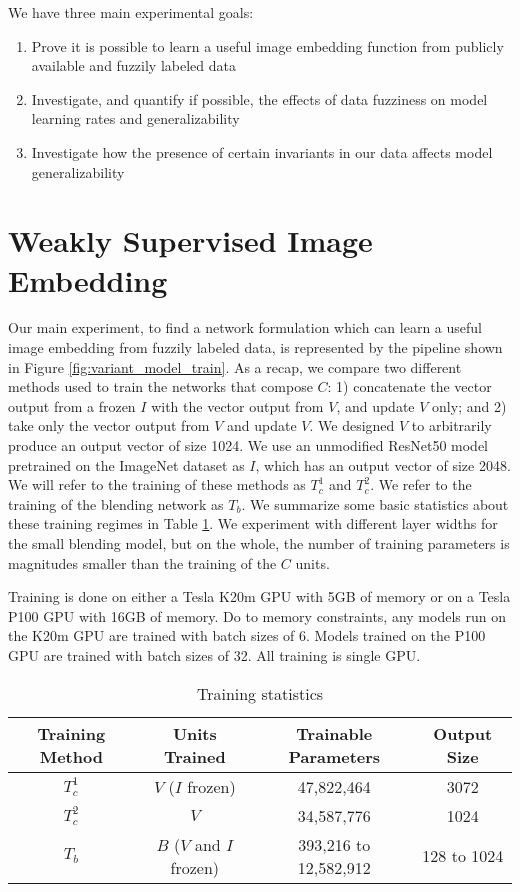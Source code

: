 We have three main experimental goals:
\begin{enumerate}
	\item Prove it is possible to learn a useful image embedding function from publicly available and fuzzily labeled data
	\item Investigate, and quantify if possible, the effects of data fuzziness on model learning rates and generalizability
	\item Investigate how the presence of certain invariants in our data affects model generalizability
\end{enumerate}




\section{Weakly Supervised Image Embedding}
Our main experiment, to find a network formulation which can learn a useful image embedding from fuzzily labeled data, is represented by the pipeline shown in Figure \ref{fig:variant_model_train}. As a recap, we compare two different methods used to train the networks that compose $C$: 1) concatenate the vector output from a frozen $I$ with the vector output from $V$, and update $V$ only; and 2) take only the vector output from $V$ and update $V$. We designed $V$ to arbitrarily produce an output vector of size 1024. We use an unmodified ResNet50 model pretrained on the ImageNet dataset as $I$, which has an output vector of size 2048. We will refer to the training of these methods as $T_c^1$ and  $T_c^2$. We refer to the training of the blending network as $T_b$. We summarize some basic statistics about these training regimes in Table \ref{table:embedding_parameters}. We experiment with different layer widths for the small blending model, but on the whole, the number of training parameters is magnitudes smaller than the training of the $C$ units.

Training is done on either a Tesla K20m GPU with 5GB of memory or on a Tesla P100 GPU with 16GB of memory. Do to memory constraints, any models run on the K20m GPU are trained with batch sizes of 6. Models trained on the P100 GPU are trained with batch sizes of 32. All training is single GPU. 

\begin{table}
	\begin{tabular}{*{4}{c}}
		\toprule
		\bfseries Training Method & \bfseries Units Trained & \bfseries Trainable Parameters & \bfseries Output Size\\
		\midrule
		$T_c^1$ & $V$ ($I$ frozen) & 47,822,464 & 3072\\
		$T_c^2$ & $V$ & 34,587,776 & 1024\\
		$T_b$ & $B$ ($V$ and $I$ frozen) & 393,216 to 12,582,912 & 128 to 1024\\
		\bottomrule
	\end{tabular}
	\caption{Training statistics}
	\label{table:embedding_parameters}
\end{table}

